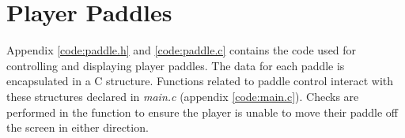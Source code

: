 \section{Player Paddles} 

Appendix \ref{code:paddle.h} and \ref{code:paddle.c} contains the code used for controlling and displaying player paddles.
The data for each paddle is encapsulated in a C structure.
Functions related to paddle control interact with these structures declared in \emph{main.c} (appendix \ref{code:main.c}).
Checks are performed in the  function to ensure the player is unable to move their paddle off the screen in either direction.